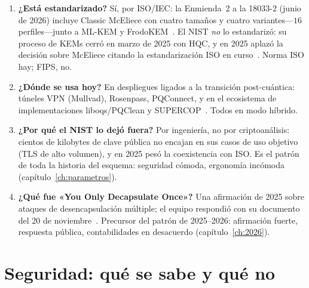 \begin{enumerate}[leftmargin=1.9em,itemsep=5pt,start=8]
  \item \textbf{¿Está estandarizado?} Sí, por ISO/IEC: la
        Enmienda~2 a la 18033-2 (junio de 2026) incluye Classic
        McEliece con cuatro tamaños y cuatro variantes---$16$
        perfiles---junto a ML-KEM y FrodoKEM~\cite{iso18033,cmiso}.
        El NIST \emph{no} lo estandarizó: su proceso de KEMs cerró
        en marzo de 2025 con HQC, y en 2025 aplazó la decisión sobre
        McEliece citando la estandarización ISO en
        curso~\cite{nist8545,cmnist}. Norma ISO hay; FIPS, no.

  \item \textbf{¿Dónde se usa hoy?} En despliegues ligados a la
        transición post-cuántica: túneles VPN (Mullvad), Rosenpass,
        PQConnect, y en el ecosistema de implementaciones
        liboqs/PQClean y SUPERCOP~\cite{bernstein2026,cmimpl}.
        Todos en modo híbrido.

  \item \textbf{¿Por qué el NIST lo dejó fuera?} Por ingeniería, no
        por criptoanálisis: cientos de kilobytes de clave pública no
        encajan en sus casos de uso objetivo (TLS de alto
        volumen), y en 2025 pesó la coexistencia con ISO. Es el
        patrón de toda la historia del esquema: seguridad cómoda,
        ergonomía incómoda (capítulo~\ref{ch:parametros}).

  \item \textbf{¿Qué fue «You Only Decapsulate Once»?} Una
        afirmación de 2025 sobre ataques de desencapsulación
        múltiple; el equipo respondió con su documento del 20 de
        noviembre~\cite{cm2025yodo}. Precursor del patrón de
        2025--2026: afirmación fuerte, respuesta pública,
        contabilidades en desacuerdo (capítulo~\ref{ch:2026}).
\end{enumerate}

\section{Seguridad: qué se sabe y qué no}

